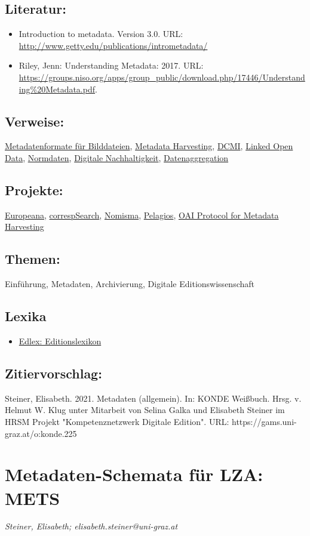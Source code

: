 \documentclass{article}
\begin{document}
        \subsection*{Literatur:}\begin{itemize}\item Introduction to metadata. Version 3.0. URL: \url{http://www.getty.edu/publications/intrometadata/}\item Riley, Jenn: Understanding Metadata: 2017. URL: \url{https://groups.niso.org/apps/group_public/download.php/17446/Understanding%20Metadata.pdf}.\end{itemize}\subsection*{Verweise:}\href{https://gams.uni-graz.at/o:konde.124}{Metadatenformate für Bilddateien}, \href{https://gams.uni-graz.at/o:konde.10}{Metadata Harvesting}, \href{https://gams.uni-graz.at/o:konde.128}{DCMI}, \href{https://gams.uni-graz.at/o:konde.8}{Linked Open Data}, \href{https://gams.uni-graz.at/o:konde.147}{Normdaten}, \href{https://gams.uni-graz.at/o:konde.6}{Digitale Nachhaltigkeit}, \href{https://gams.uni-graz.at/o:konde.49}{Datenaggregation}\subsection*{Projekte:}\href{https://www.europeana.eu/portal/de}{Europeana}, \href{https://correspsearch.net}{correspSearch}, \href{http://nomisma.org/}{Nomisma}, \href{https://pelagios.org/}{Pelagios}, \href{http://openarchives.org/OAI/openarchivesprotocol.html}{OAI Protocol for Metadata Harvesting}\subsection*{Themen:}Einführung, Metadaten, Archivierung, Digitale Editionswissenschaft\subsection*{Lexika}\begin{itemize}\item \href{https://edlex.de/index.php?title=Metadaten_(digitale)}{Edlex: Editionslexikon}\end{itemize}\subsection*{Zitiervorschlag:}Steiner, Elisabeth. 2021. Metadaten (allgemein). In: KONDE Weißbuch. Hrsg. v. Helmut W. Klug unter Mitarbeit von Selina Galka und Elisabeth Steiner im HRSM Projekt "Kompetenznetzwerk Digitale Edition". URL: https://gams.uni-graz.at/o:konde.225\newpage\section*{Metadaten-Schemata für LZA: METS} \emph{Steiner, Elisabeth; elisabeth.steiner@uni-graz.at }\\
        
\end{document}
